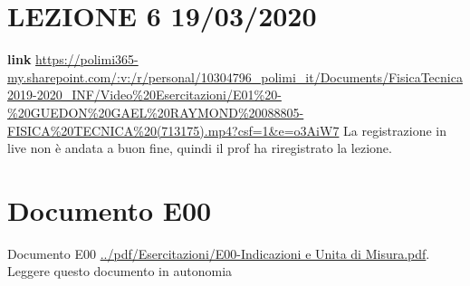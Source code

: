 \section*{LEZIONE 6 19/03/2020}
\textbf{link} \url{https://polimi365-my.sharepoint.com/:v:/r/personal/10304796_polimi_it/Documents/FisicaTecnica2019-2020_INF/Video%20Esercitazioni/E01%20-%20GUEDON%20GAEL%20RAYMOND%20088805-FISICA%20TECNICA%20(713175).mp4?csf=1&e=o3AiW7}\newline
La registrazione in live non è andata a buon fine, quindi il prof ha riregistrato la lezione.
\section*{Documento E00}
Documento E00 \url{../pdf/Esercitazioni/E00-Indicazioni e Unita di Misura.pdf}.\newline
\newline
Leggere questo documento in autonomia
